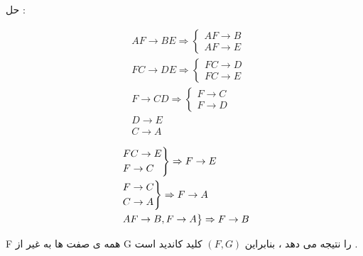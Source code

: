 \documentclass{article}
\begin{document}
حل :

\begin{align*}
&AF \to BE \Rightarrow \begin{cases*} AF \to B \\ AF \to E \end{cases*} \\
&FC \to DE \Rightarrow \begin{cases*} FC \to D \\ FC \to E \end{cases*} \\
&F \to CD \Rightarrow \begin{cases*} F \to C \\ F \to D \end{cases*} \\
&D \to E \\
&C \to A 
\end{align*}

\begin{align*}
&\begin{rcases*}FC \to E \\ F \to C \end{rcases*} \Rightarrow F \to E \\
&\begin{rcases*}F \to C \\ C \to A \end{rcases*} \Rightarrow F \to A \\
&\begin{rcases*}AF \to B , F \to A  \end{rcases*}\Rightarrow F \to B \\
\end{align*}



F
همه ی صفت ها به غیر از G را نتیجه می دهد ، بنابراین 
$ (F , G) $
کلید کاندید است .
\end{document}
